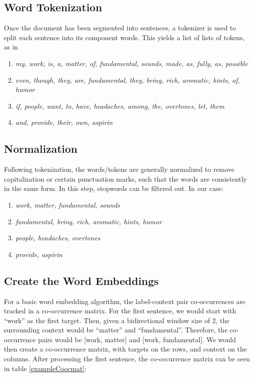 \subsection{Word Tokenization}

Once the document has been segmented into sentences, a tokenizer is used to split each sentence into its component words. This yields a list of lists of tokens, as in
\begin{enumerate}
\setlength{\itemsep}{0pt}
\setlength{\parsep}{0pt}
\setlength{\topsep}{0pt}
    \item \textit{my, work, is, a, matter, of, fundamental, sounds, made, as, fully, as, possible}
    \item \textit{even, though, they, are, fundamental, they, bring, rich, aromatic, hints, of, humor}
    \item \textit{if, people, want, to, have, headaches, among, the, overtones, let, them}
    \item \textit{and, provide, their, own, aspirin}
\end{enumerate}

\subsection{Normalization}

Following tokenization, the words/tokens are generally normalized to remove capitalization or certain punctuation marks, such that the words are consistently in the same form. In this step, stopwords can be filtered out. In our case:
\begin{enumerate}
\setlength{\itemsep}{0pt}
\setlength{\parsep}{0pt}
\setlength{\topsep}{0pt}
    \item \textit{work, matter, fundamental, sounds}
    \item \textit{fundamental, bring, rich, aromatic, hints, humor}
    \item \textit{people, headaches, overtones}
    \item \textit{provide, aspirin}
\end{enumerate}

\subsection{Create the Word Embeddings}

For a  basic word embedding algorithm, the label-context pair co-occurrences are tracked in a co-occurrence matrix. For the first sentence, we would start with ``work'' as the first target. Then, given a bidirectional window size of 2, the surrounding context would be ``matter'' and ``fundamental''. Therefore, the co-occurrence pairs would be [work, matter] and [work, fundamental]. We would then create a co-occurrence matrix, with targets on the rows, and context on the columns.  After processing the first sentence, the co-occurrence matrix can be seen in table \ref{exampleCoocmat}:

